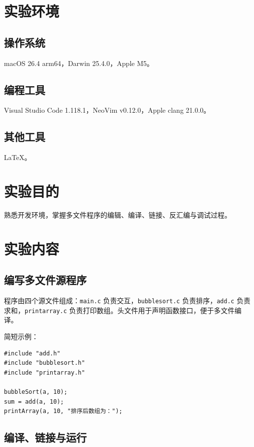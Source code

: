 \documentclass[12pt, a4paper]{academics}
\begin{document}
\makeacademicscover

\section{实验环境}

\subsection{操作系统}

macOS 26.4 arm64，Darwin 25.4.0，Apple M5。

\subsection{编程工具}

Visual Studio Code 1.118.1，NeoVim v0.12.0，Apple clang 21.0.0。

\subsection{其他工具}

\LaTeX{}。

\section{实验目的}

熟悉开发环境，掌握多文件程序的编辑、编译、链接、反汇编与调试过程。

\section{实验内容}

\subsection{编写多文件源程序}

程序由四个源文件组成：\texttt{main.c} 负责交互，\texttt{bubblesort.c} 负责排序，\texttt{add.c} 负责求和，\texttt{printarray.c} 负责打印数组。头文件用于声明函数接口，便于多文件编译。

简短示例：
\begin{verbatim}
#include "add.h"
#include "bubblesort.h"
#include "printarray.h"

bubbleSort(a, 10);
sum = add(a, 10);
printArray(a, 10, "排序后数组为：");
\end{verbatim}

\subsection{编译、链接与运行}
\end{document}
